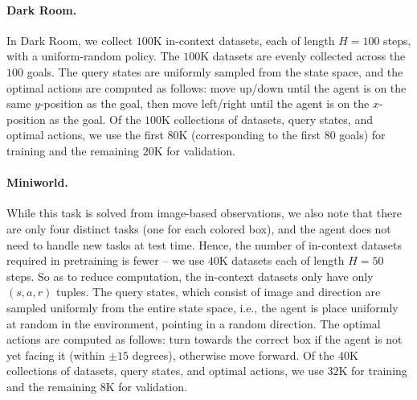 \documentclass{article}
\begin{document}
\paragraph{Dark Room.} In Dark Room, we collect $100$K in-context datasets, each of length $H = 100$ steps, with a uniform-random policy. The $100$K datasets are evenly collected across the $100$ goals. The query states are uniformly sampled from the state space, and the optimal actions are computed as follows: move up/down until the agent is on the same $y$-position as the goal, then move left/right until the agent is on the $x$-position as the goal. Of the $100$K collections of datasets, query states, and optimal actions, we use the first $80$K (corresponding to the first $80$ goals) for training and the remaining $20$K for validation.
\paragraph{Miniworld.} While this task is solved from image-based observations, we also note that there are only four distinct tasks (one for each colored box), and the agent does not need to handle new tasks at test time. Hence, the number of in-context datasets required in pretraining is fewer -- we use $40$K datasets each of length $H = 50$ steps. So as to reduce computation, the in-context datasets only have only $(s, a, r)$ tuples. The query states, which consist of image and direction are sampled uniformly from the entire state space, i.e., the agent is place uniformly at random in the environment, pointing in a random direction. The optimal actions are computed as follows: turn towards the correct box if the agent is not yet facing it (within $\pm 15$ degrees), otherwise move forward. Of the $40$K collections of datasets, query states, and optimal actions, we use $32$K for training and the remaining $8$K for validation.
\end{document}
